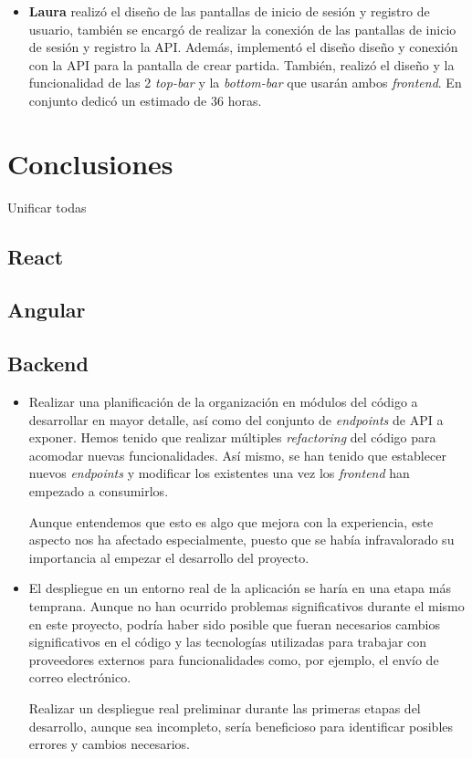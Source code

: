 \documentclass[11pt, a4paper, titlepage]{article}
\begin{document}
\begin{itemize}
    \item \textbf{Laura} realizó el diseño de las pantallas de inicio de sesión y registro de usuario, también se encargó de realizar la conexión de las pantallas de inicio de sesión y registro la API. Además, implementó el diseño diseño y conexión con la API para la pantalla de crear partida. También, realizó el diseño y la funcionalidad de las 2 \textit{top-bar} y la \textit{bottom-bar} que usarán ambos \textit{frontend}. En conjunto dedicó un estimado de 36 horas.
\end{itemize}

\section{Conclusiones}
Unificar todas

\subsection{React}
\subsection{Angular}
\subsection{Backend}
\begin{itemize}
    \item Realizar una planificación de la organización en módulos del código a desarrollar en mayor detalle, así como del conjunto de \textit{endpoints} de API a exponer. Hemos tenido que realizar múltiples \textit{refactoring} del código para acomodar nuevas funcionalidades. Así mismo, se han tenido que establecer nuevos \textit{endpoints} y modificar los existentes una vez los \textit{frontend} han empezado a consumirlos.
    
    Aunque entendemos que esto es algo que mejora con la experiencia, este aspecto nos ha afectado especialmente, puesto que se había infravalorado su importancia al empezar el desarrollo del proyecto.
    
    \item El despliegue en un entorno real de la aplicación se haría en una etapa más temprana. Aunque no han ocurrido problemas significativos durante el mismo en este proyecto, podría haber sido posible que fueran necesarios cambios significativos en el código y las tecnologías utilizadas para trabajar con proveedores externos para funcionalidades como, por ejemplo, el envío de correo electrónico.
    
    Realizar un despliegue real preliminar durante las primeras etapas del desarrollo, aunque sea incompleto, sería beneficioso para identificar posibles errores y cambios necesarios.
\end{itemize}
\end{document}
